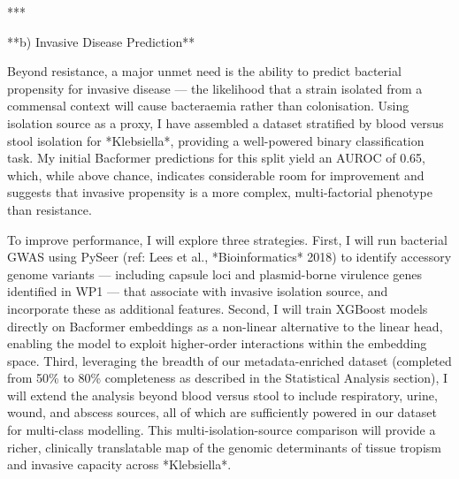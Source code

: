 \documentclass{article}
\begin{document}
***

**b) Invasive Disease Prediction**

Beyond resistance, a major unmet need is the ability to predict bacterial propensity for invasive disease — the likelihood that a strain isolated from a commensal context will cause bacteraemia rather than colonisation. Using isolation source as a proxy, I have assembled a dataset stratified by blood versus stool isolation for *Klebsiella*, providing a well-powered binary classification task. My initial Bacformer predictions for this split yield an AUROC of 0.65, which, while above chance, indicates considerable room for improvement and suggests that invasive propensity is a more complex, multi-factorial phenotype than resistance.

To improve performance, I will explore three strategies. First, I will run bacterial GWAS using PySeer (ref: Lees et al., *Bioinformatics* 2018) to identify accessory genome variants — including capsule loci and plasmid-borne virulence genes identified in WP1 — that associate with invasive isolation source, and incorporate these as additional features. Second, I will train XGBoost models directly on Bacformer embeddings as a non-linear alternative to the linear head, enabling the model to exploit higher-order interactions within the embedding space. Third, leveraging the breadth of our metadata-enriched dataset (completed from 50\% to 80\% completeness as described in the Statistical Analysis section), I will extend the analysis beyond blood versus stool to include respiratory, urine, wound, and abscess sources, all of which are sufficiently powered in our dataset for multi-class modelling. This multi-isolation-source comparison will provide a richer, clinically translatable map of the genomic determinants of tissue tropism and invasive capacity across *Klebsiella*.
\end{document}
